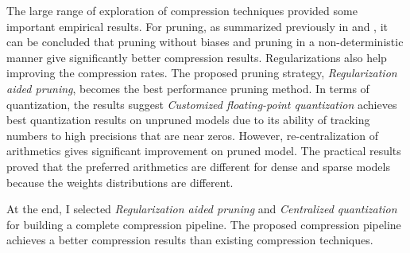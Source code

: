 \documentclass[a4paper,12pt]{report}
\begin{document}
The large range of exploration of compression techniques provided some important
empirical results.
For pruning, as summarized previously in  and ,
it can be concluded that pruning without biases and pruning in a non-deterministic
manner give significantly better compression results.
Regularizations also help improving the compression rates.
The proposed pruning strategy, \textit{Regularization aided pruning}, becomes
the best performance pruning method.
In terms of quantization, the results suggest \textit{Customized floating-point
quantization} achieves best quantization results on unpruned models due to its
ability of tracking numbers to high precisions that are near zeros.
However, re-centralization of arithmetics gives significant improvement on
pruned model.
The practical results proved that the preferred arithmetics are different for dense and
sparse models because the weights distributions are different.

At the end, I selected \textit{Regularization aided pruning} and \textit{Centralized quantization}
for building a complete compression pipeline.
The proposed compression pipeline achieves a better compression results than existing
compression techniques.
\end{document}
